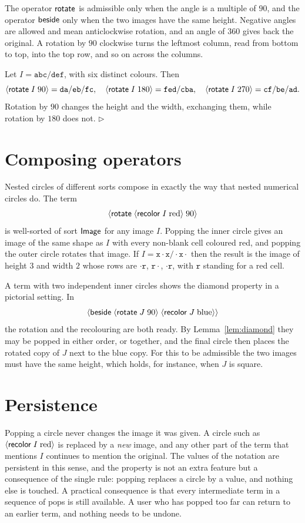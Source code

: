 The operator $\mathsf{rotate}$ is admissible only when the angle is a multiple of $90$, and the operator $\mathsf{beside}$ only when the two images have the same height. Negative angles are allowed and mean anticlockwise rotation, and an angle of $360$ gives back the original. A rotation by $90$ clockwise turns the leftmost column, read from bottom to top, into the top row, and so on across the columns.

\begin{example}\label{ex:rotate}
Let $I=\mathtt{abc/def}$, with six distinct colours. Then
\[
\langle \mathsf{rotate}\; I\; 90\rangle=\mathtt{da/eb/fc},\quad
\langle \mathsf{rotate}\; I\; 180\rangle=\mathtt{fed/cba},\quad
\langle \mathsf{rotate}\; I\; 270\rangle=\mathtt{cf/be/ad}.
\]
Rotation by $90$ changes the height and the width, exchanging them, while rotation by $180$ does not. \hfill$\triangleright$
\end{example}

\section{Composing operators}

Nested circles of different sorts compose in exactly the way that nested numerical circles do. The term
\[
\langle \mathsf{rotate}\; \langle \mathsf{recolor}\; I\; \mathrm{red}\rangle\; 90\rangle
\]
is well-sorted of sort $\mathsf{Image}$ for any image $I$. Popping the inner circle gives an image of the same shape as $I$ with every non-blank cell coloured red, and popping the outer circle rotates that image. If $I=\mathtt{x\cdot x/\cdot x\cdot}$ then the result is the image of height $3$ and width $2$ whose rows are $\mathtt{\cdot r}$, $\mathtt{r\cdot}$, $\mathtt{\cdot r}$, with $\mathtt{r}$ standing for a red cell.

A term with two independent inner circles shows the diamond property in a pictorial setting. In
\[
\langle \mathsf{beside}\; \langle \mathsf{rotate}\; J\; 90\rangle\; \langle \mathsf{recolor}\; J\; \mathrm{blue}\rangle\rangle
\]
the rotation and the recolouring are both ready. By Lemma~\ref{lem:diamond} they may be popped in either order, or together, and the final circle then places the rotated copy of $J$ next to the blue copy. For this to be admissible the two images must have the same height, which holds, for instance, when $J$ is square.

\section{Persistence}

Popping a circle never changes the image it was given. A circle such as $\langle \mathsf{recolor}\; I\; \mathrm{red}\rangle$ is replaced by a \emph{new} image, and any other part of the term that mentions $I$ continues to mention the original. The values of the notation are persistent in this sense, and the property is not an extra feature but a consequence of the single rule: popping replaces a circle by a value, and nothing else is touched. A practical consequence is that every intermediate term in a sequence of pops is still available. A user who has popped too far can return to an earlier term, and nothing needs to be undone.

